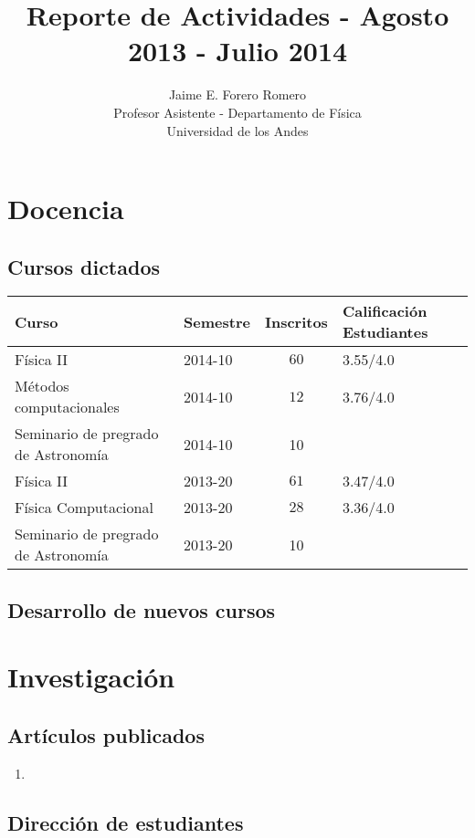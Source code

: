 \documentclass{article}
\title{Reporte de Actividades - Agosto 2013 - Julio 2014}
\author{Jaime E. Forero Romero\\Profesor Asistente - Departamento de
  F\'isica\\Universidad de los Andes}
\begin{document}
\maketitle
\tableofcontents
\newpage

\section{Docencia}

\subsection{Cursos dictados}
\begin{tabular}{p{6.0cm} l c p{2cm}}\hline
Curso & Semestre & Inscritos & Calificaci\'on Estudiantes\\\hline
F\'isica II & 2014-10 & $60$  & 3.55/4.0\\
M\'etodos computacionales & 2014-10 & $12$ & 3.76/4.0\\
Seminario de pregrado de Astronom\'ia & 2014-10 & 10 & \\\hline
F\'isica II & 2013-20 & $61$ & 3.47/4.0\\
F\'isica Computacional & 2013-20 & $28$ & 3.36/4.0\\
Seminario de pregrado de Astronom\'ia & 2013-20 & 10 & \\\hline
\end{tabular}

\subsection{Desarrollo de nuevos cursos}



\newpage
\section{Investigaci\'on}

\subsection{Art\'iculos publicados}

\begin{enumerate}
\item 
\end{enumerate}

\subsection{Direcci\'on de estudiantes}
\end{document}
